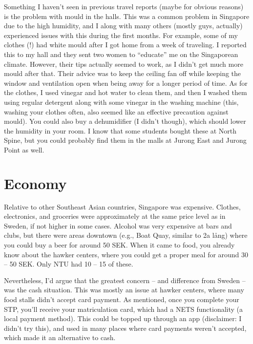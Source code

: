 \vspace{-0.6cm}
Something I haven't seen in previous travel reports (maybe for obvious reasons) is the problem with mould in the halls. This was a common problem in Singapore due to the high humidity, and I along with many others (mostly guys, actually) experienced issues with this during the first months. For example, some of my clothes (!) had white mould after I got home from a week of traveling. I reported this to my hall and they sent two women to ``educate'' me on the Singaporean climate. However, their tips actually seemed to work, as I didn't get much more mould after that. Their advice was to keep the ceiling fan off while keeping the window and ventilation open when being away for a longer period of time. As for the clothes, I used vinegar and hot water to clean them, and then I washed them using regular detergent along with some vinegar in the washing machine (this, washing your clothes often, also seemed like an effective precaution against mould). You could also buy a dehumidifier (I didn't though), which should lower the humidity in your room. I know that some students bought these at North Spine, but you could probably find them in the malls at Jurong East and Jurong Point as well.
\vspace{-0.08cm}
\section*{Economy}
\label{eco}
Relative to other Southeast Asian countries, Singapore was expensive. Clothes, electronics, and groceries were approximately at the same price level as in Sweden, if not higher in some cases. Alcohol was very expensive at bars and clubs, but there were areas downtown (e.g., Boat Quay, similar to 2a lång) where you could buy a beer for around 50 SEK. When it came to food, you already know about the hawker centers, where you could get a proper meal for around 30 -- 50 SEK. Only NTU had 10 -- 15 of these.

Nevertheless, I'd argue that the greatest concern -- and difference from Sweden -- was the cash situation. This was mostly an issue at hawker centers, where many food stalls didn't accept card payment. As mentioned, once you complete your STP, you'll receive your matriculation card, which had a NETS functionality (a local payment method). This could be topped up through an app (disclaimer: I didn't try this), and used in many places where card payments weren't accepted, which made it an alternative to cash.

